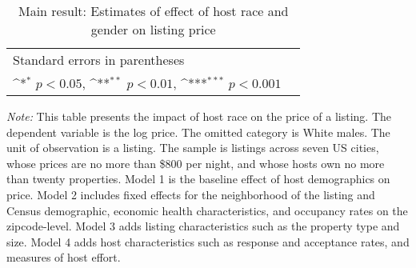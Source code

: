 

\newpage


\newpage


\newpage


\newpage

\begin{table}[htbp]\centering
	\def\sym#1{\ifmmode^{#1}\else\(^{#1}\)\fi}
	\caption{Main result: Estimates of effect of host race and gender on listing price}
	\begin{tabular}{l*{5}{c}}
		\hline\hline
		
		\hline\hline
		\multicolumn{5}{l}{\footnotesize Standard errors in parentheses}\\
		\multicolumn{5}{l}{\footnotesize \sym{*} \(p<0.05\), \sym{**} \(p<0.01\), \sym{***} \(p<0.001\)}\\
	\end{tabular}	
\label{table:price}
	\begin{tablenotes}
		
		\item {\it Note:} This table presents the impact of host race on the price of a listing. The dependent variable is the log price. The omitted category is White males. The unit of observation is a listing. The sample is listings across seven US cities, whose prices are no more than \$800 per night, and whose hosts own no more than twenty properties. Model 1 is the baseline effect of host demographics on price. Model 2 includes fixed effects for the neighborhood of the listing and Census demographic, economic health characteristics, and occupancy rates on the zipcode-level. Model 3 adds listing characteristics such as the property type and size. Model 4 adds host characteristics such as response and acceptance rates, and measures of host effort.  
		
	\end{tablenotes}
\end{table}



